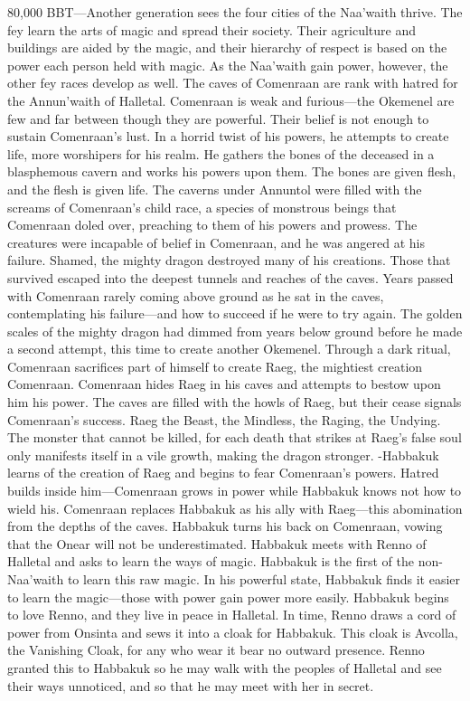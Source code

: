 \documentclass[smalldemyvopaper,11pt,twoside,onecolumn,openright,extrafontsizes]{memoir}
\begin{document}
80,000 BBT—Another generation sees the four cities of the Naa’waith thrive. The fey learn the arts of magic and spread their society. Their agriculture and buildings are aided by the magic, and their hierarchy of respect is based on the power each person held with magic. As the Naa’waith gain power, however, the other fey races develop as well. The caves of Comenraan are rank with hatred for the Annun’waith of Halletal. Comenraan is weak and furious—the Okemenel are few and far between though they are powerful. Their belief is not enough to sustain Comenraan’s lust. In a horrid twist of his powers, he attempts to create life, more worshipers for his realm. He gathers the bones of the deceased in a blasphemous cavern and works his powers upon them. The bones are given flesh, and the flesh is given life. The caverns under Annuntol were filled with the screams of Comenraan’s child race, a species of monstrous beings that Comenraan doled over, preaching to them of his powers and prowess. The creatures were incapable of belief in Comenraan, and he was angered at his failure. Shamed, the mighty dragon destroyed many of his creations. Those that survived escaped into the deepest tunnels and reaches of the caves. Years passed with Comenraan rarely coming above ground as he sat in the caves, contemplating his failure—and how to succeed if he were to try again. The golden scales of the mighty dragon had dimmed from years below ground before he made a second attempt, this time to create another Okemenel. Through a dark ritual, Comenraan sacrifices part of himself to create Raeg, the mightiest creation Comenraan. Comenraan hides Raeg in his caves and attempts to bestow upon him his power. The caves are filled with the howls of Raeg, but their cease signals Comenraan’s success. Raeg the Beast, the Mindless, the Raging, the Undying. The monster that cannot be killed, for each death that strikes at Raeg’s false soul only manifests itself in a vile growth, making the dragon stronger.
-Habbakuk learns of the creation of Raeg and begins to fear Comenraan’s powers. Hatred 
builds inside him—Comenraan grows in power while Habbakuk knows not how to wield his. Comenraan replaces Habbakuk as his ally with Raeg—this abomination from the depths of the caves. Habbakuk turns his back on Comenraan, vowing that the Onear will not be underestimated. Habbakuk meets with Renno of Halletal and asks to learn the ways of magic. Habbakuk is the first of the non-Naa’waith to learn this raw magic. In his powerful state, Habbakuk finds it easier to learn the magic—those with power gain power more easily. Habbakuk begins to love Renno, and they live in peace in Halletal. In time, Renno draws a cord of power from Onsinta and sews it into a cloak for Habbakuk. This cloak is Avcolla, the Vanishing Cloak, for any who wear it bear no outward presence. Renno granted this to Habbakuk so he may walk with the peoples of Halletal and see their ways unnoticed, and so that he may meet with her in secret.
\end{document}
